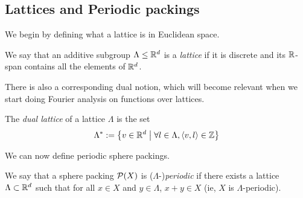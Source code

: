 \subsection{Lattices and Periodic packings}

We begin by defining what a lattice is in Euclidean space.

\begin{definition}\label{IsZLattice}\leanok
  We say that an additive subgroup $\Lambda \leq \mathbb{R}^d$ is a \emph{lattice} if it is discrete and its $\mathbb{R}$-span contains all the elements of $\mathbb{R}^d$.
\end{definition}

There is also a corresponding dual notion, which will become relevant when we start doing Fourier analysis on functions over lattices.

\begin{definition}\label{def:dual-lattice}\leanok%
  The \emph{dual lattice} of a lattice $\Lambda$ is the set
  \[ \Lambda^* := \left\{ v \in \mathbb{R}^d \; \middle| \; \forall l \in \Lambda, \left\langle v,l \right\rangle \in \mathbb{Z} \right\} \]
\end{definition}



We can now define periodic sphere packings.

\begin{definition}\label{PeriodicSpherePacking}\leanok
  We say that a sphere packing $\mathcal{P}(X)$ is ($\Lambda$-)\emph{periodic} if there exists a lattice $\Lambda \subset \mathbb{R}^d$ such that for all $x \in X$ and $y \in \Lambda$, $x + y \in X$ (ie, $X$ is $\Lambda$-periodic).
\end{definition}

